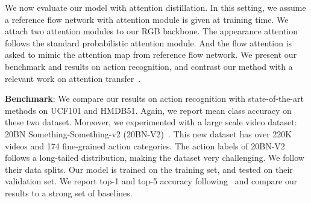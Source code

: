 \documentclass[10pt,twocolumn,letterpaper]{article}
\begin{document}
We now evaluate our model with attention distillation. In this setting, we assume a reference flow network with attention module is given at training time. We attach two attention modules to our RGB backbone. The appearance attention follows the standard probabilistic attention module. And the flow attention is asked to mimic the attention map from reference flow network. We present our benchmark and results on action recognition, and contrast our method with a relevant work on attention transfer~\cite{Zagoruyko2017AT}.  

\noindent \textbf{Benchmark}: We compare our results on action recognition with state-of-the-art methods on UCF101 and HMDB51. Again, we report mean class accuracy on these two dataset. Moreover, we experimented with a large scale video dataset: 20BN Something-Something-v2 (20BN-V2)~\cite{mahdisoltani2018fine}. This new dataset has over 220K videos and 174 fine-grained action categories. The action labels of 20BN-V2 follows a long-tailed distribution, making the dataset very challenging. We follow their data splits. Our model is trained on the training set, and tested on their validation set. We report top-1 and top-5 accuracy following~\cite{mahdisoltani2018fine,zhou2017temporal} and compare our results to a strong set of baselines.
\end{document}
